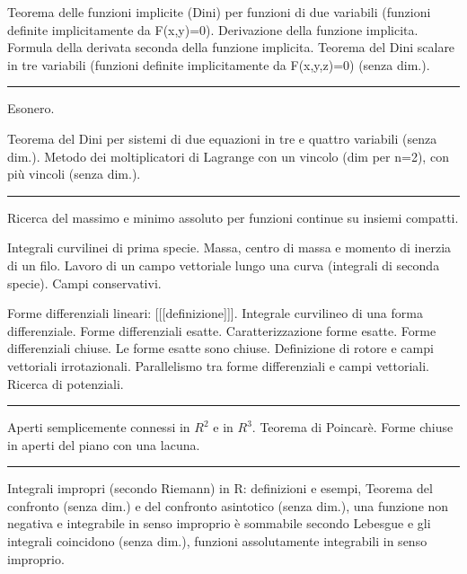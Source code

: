 \documentclass[a4paper,10pt]{article} %
\begin{document}
\begin{multicols}{2}
Teorema delle funzioni implicite (Dini) per funzioni di due variabili (funzioni definite implicitamente da F(x,y)=0). Derivazione della funzione implicita. Formula della derivata seconda della funzione implicita. Teorema del Dini scalare in tre variabili (funzioni definite implicitamente da F(x,y,z)=0) (senza dim.).




\bigbreak
\hrule
\bigbreak




Esonero.

Teorema del Dini per sistemi di due equazioni in tre e quattro variabili (senza dim.). Metodo dei moltiplicatori di Lagrange con un vincolo (dim per n=2), con più vincoli (senza dim.).



\bigbreak
\hrule
\bigbreak




Ricerca del massimo e minimo assoluto per funzioni continue su insiemi compatti.

Integrali curvilinei di prima specie. Massa, centro di massa e momento di inerzia di un filo. Lavoro di un campo vettoriale lungo una curva (integrali di seconda specie). Campi conservativi.

Forme differenziali lineari: [[[definizione]]]. Integrale curvilineo di una forma differenziale. Forme differenziali esatte. Caratterizzazione forme esatte. Forme differenziali chiuse. Le forme esatte sono chiuse. Definizione di rotore e campi vettoriali irrotazionali. Parallelismo tra forme differenziali e campi vettoriali. Ricerca di potenziali.





\bigbreak
\hrule
\bigbreak




Aperti semplicemente connessi in $R^2$ e in $R^3$. Teorema di Poincarè. Forme chiuse in aperti del piano con una lacuna.





\bigbreak
\hrule
\bigbreak




Integrali impropri (secondo Riemann) in R: definizioni e esempi, Teorema del confronto (senza dim.) e del confronto asintotico (senza dim.), una funzione non negativa e integrabile in senso improprio è sommabile secondo Lebesgue e gli integrali coincidono (senza dim.), funzioni assolutamente integrabili in senso improprio.


\end{multicols}
\end{document}
